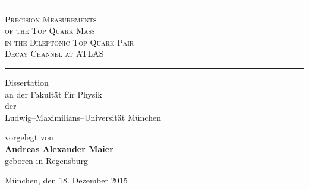 \thispagestyle{empty}
\begin{center}

~
\vspace{1cm}

\hfill \rule{\textwidth}{1pt}
\vspace{0.9cm}

\textsc{\Huge Precision Measurements\\ }
\vspace{0.8cm}
\textsc{\Huge of the Top Quark Mass\\}
\vspace{0.8cm}
\textsc{\Huge in the Dileptonic Top Quark Pair\\}
\vspace{0.8cm}
\textsc{\Huge Decay Channel at ATLAS\\}
\vspace{1.4cm}

\hfill \rule{\textwidth}{1pt}

\vspace{1.5cm}


{ \Large
Dissertation \\
an der Fakult\"at f\"ur Physik \\
der \\
Ludwig--Maximilians--Universit\"at M\"unchen

\vspace{1.2cm}
vorgelegt von \\
{\bf Andreas Alexander Maier} \\
geboren in Regensburg

\vspace{1.2cm}

M\"unchen, den 18. Dezember 2015 

% 
}




\end{center}




\thispagestyle{empty}
~

\vfill

\clearpage
~

